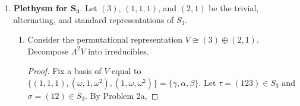 \documentclass[../psets.tex]{subfiles}
\begin{document}
\begin{enumerate}
\begin{enumerate}
\begin{proof}
\begin{align*}
                &= \left( \sum_{i=1}^nx_i\zeta^{i-1} \right)
                \begin{bmatrix}
                    1\\
                    \zeta\\
                    \zeta^2\\
                    \vdots\\
                    \zeta^{n-1}
                \end{bmatrix}
            \end{align*}
            as desired.
        \end{proof}
        \item Compute the eigenvalues and the determinant of a circulant matrix. Factorize the group determinant for $G=\Z/n\Z$.
        \begin{proof}
            By the same logic used in part (a), one can find by inspection that the $n$ distinct eigenvectors are of the form $(\zeta^{j(0)},\dots,\zeta^{j(n-1)})$, $j=0,\dots,n-1$. It follows by similar logic once again that the corresponding eigenvalues are of the form
            \begin{equation*}
                \boxed{\lambda_j = \sum_{i=1}^nx_i\zeta^{j(i-1)},\ j=0,\dots,n-1}
            \end{equation*}
            Moreover, since the determinant is the product of the eigenvalues,
            \begin{equation*}
                \boxed{\det = \lambda_0\cdots\lambda_{n-1}}
            \end{equation*}
            where $\lambda_j$ is defined as above.\par
            Therefore, since the multiplication table of $\Z/n\Z$ converts into an $n\times n$ circulant matrix, the factorization of its group determinant is 
        \end{proof}
    \end{enumerate}
    \item \textbf{Plethysm for $\bm{S_3}$}. Let $(3)$, $(1,1,1)$, and $(2,1)$ be the trivial, alternating, and standard representations of $S_3$.
    \begin{enumerate}
        \item Consider the permutational representation $V\cong(3)\oplus(2,1)$. Decompose $\Lambda^2V$ into irreducibles.
        \begin{proof}
            Fix a basis of $V$ equal to $\{(1,1,1),(\omega,1,\omega^2),(1,\omega,\omega^2)\}=\{\gamma,\alpha,\beta\}$. Let $\tau=(123)\in S_3$ and $\sigma=(12)\in S_3$. By Problem 2a,

\end{proof}
\end{enumerate}
\end{enumerate}
\end{document}
